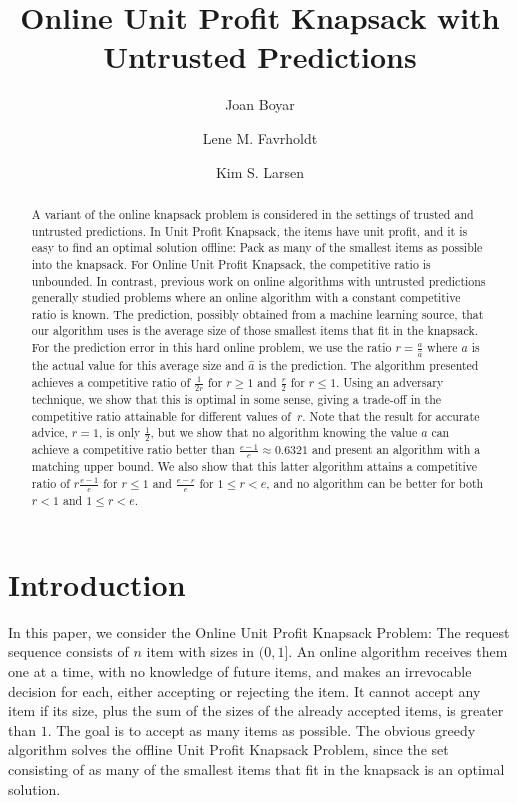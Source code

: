 \documentclass[a4paper,UKenglish,cleveref, autoref, thm-restate]{lipics-v2021}
\title{Online Unit Profit Knapsack with Untrusted Predictions} %
\author{Joan Boyar}{University of Southern Denmark, Odense, Denmark \and \url{https://imada.sdu.dk/~joan/}}{joan@imada.sdu.dk}{https://orcid.org/0000-0002-0725-8341}{}
\author{Lene M. Favrholdt}{University of Southern Denmark, Odense, Denmark \and \url{https://imada.sdu.dk/~lenem/}}{lenem@imada.sdu.dk}{https://orcid.org/0000-0003-3054-2997}{}
\author{Kim S. Larsen}{University of Southern Denmark, Odense, Denmark \and \url{https://imada.sdu.dk/~kslarsen/}}{kslarsen@imada.sdu.dk}{https://orcid.org/0000-0003-0560-3794}{}
\newcommand{\guess}{\ensuremath{\hat{a}}\xspace}
\begin{document}
\maketitle

\begin{abstract}
  A variant of the online knapsack problem is considered in the
  settings of trusted and untrusted predictions.  In Unit Profit
  Knapsack, the items have unit profit, and it is easy to find an
  optimal solution offline: Pack as many of the smallest items as
  possible into the knapsack.  For Online Unit Profit Knapsack, the
  competitive ratio is unbounded.
   In contrast,
   previous work on online algorithms with untrusted
   predictions generally
  studied problems where an online algorithm with a constant
  competitive ratio is known. 
  The prediction, possibly obtained from a machine learning source,
  that our algorithm uses is the average size of those smallest items
  that fit in the knapsack.  For the prediction error in this hard
  online problem, we use the ratio
  $r=\frac{a}{\guess}$ 
  where $a$ is the actual value for this average size and \guess is
  the prediction. The algorithm presented achieves a competitive ratio
  of $\frac{1}{2r}$ for $r\geq 1$ and $\frac{r}{2}$ for $r\leq
  1$. Using an adversary technique, we show that this is optimal in
  some sense, giving a trade-off in the competitive ratio attainable
  for different values of~$r$.  Note that the result for accurate
  advice, $r=1$, is only $\frac{1}{2}$, but we show that no algorithm
  knowing the value $a$ can achieve a competitive ratio better than
  $\frac{e-1}{e}\approx 0.6321$ and present an algorithm with a
  matching upper bound.
  We also show that
  this
  latter algorithm attains a competitive ratio of $r\frac{e-1}{e}$ for
  $r \leq 1$ and $\frac{e-r}{e}$ for
  $1 \leq r < e$, and no algorithm
  can be better for both $r<1$ and $1\leq r<e$.
\end{abstract}



\setcounter{page}{1}

\section{Introduction}
In this paper, we consider the Online Unit Profit Knapsack Problem:
The request sequence consists of $n$ item with sizes in $(0,1]$.  An online
algorithm receives them one at a time, with no knowledge of future
items, and makes an irrevocable decision for each, either accepting or
rejecting the item. It cannot accept any item if its size, plus the
sum of the sizes of the already accepted items, is greater than
$1$. The goal is to accept as many items as possible.  The obvious
greedy algorithm solves the offline Unit Profit Knapsack Problem,
since the set consisting of as many of the smallest items that fit in
the knapsack is an optimal solution.
\end{document}
